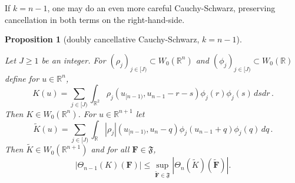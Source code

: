\documentclass[12pt,reqno]{amsart}
\theoremstyle{plain}
\newtheorem{proposition}[theorem]{Proposition}
\numberwithin{equation}{section}
\theoremstyle{remark}
\newcommand{\uses}[1]{}
\newcommand{\usesdefs}[1]{}
\newcommand{\leanok}{}
\newcommand{\lean}[1]{}
\newcommand{\R}{{\mathbb R}}
\newcommand{\F}{\mathbf{F}}
\begin{document}
If $k=n-1$, one may do an even more careful Cauchy-Schwarz, preserving cancellation in both terms on the right-hand-side.


\begin{proposition}[doubly cancellative Cauchy-Schwarz, $k=n-1$]\label{doubly cancellative Cauchy-Schwarz}\uses{}\usesdefs{auto:Wiener-space-definition,normalized function tuples,prism Brascamp--Lieb}
\lean{Auto.doublyCancellativeKernel_memW0,Auto.doublyCancellativeLift_memW0,Auto.doublyCancellativeCauchySchwarz_bound}
\leanok
Let $J\ge 1$ be an integer. For $(\rho_j)_{j\in[J)}\subset W_0(\R^n)$ and
$(\phi_j)_{j\in [J)}\subset W_0(\R)$ define for $u\in \R^n$,
\begin{equation}\label{auto:Cauchy-Schwarz-terminal-kernel-K}
    K(u)=\sum_{j\in [J)}\int_{\R^2} \rho_j(u_{[n-1)}, u_{n-1}-r-s) \phi_j(r) \phi_j(s) \, ds dr\, .
\end{equation}
Then $K\in W_0(\R^n)$.
For $u\in\R^{n+1}$ let
\begin{equation}\label{auto:Cauchy-Schwarz-terminal-kernel-tilde-K}
    \tilde{K}(u)=\sum_{j\in [J)}\int_\R |\rho_j|(u_{[n-1)}, u_{n}-q) \phi_j(u_{n-1}+q) \phi_j(q) \, dq\, .
\end{equation}
Then $\tilde{K}\in W_0(\R^{n+1})$ and for all $\F\in\mathfrak{F}$,
\begin{equation}\label{auto:Cauchy-Schwarz-at-n-minus-one-bound}
    |\Theta_{n-1}(K)(\F)| \le \sup_{\mathbf{\tilde{F}}\in\mathfrak{F}} |\Theta_{n}(\tilde{K})(\mathbf{\tilde{F}})|.
\end{equation}
\end{proposition}
\end{document}
